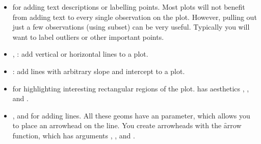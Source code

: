 % 
% 
% 
% 


\begin{itemize}
  \item {} for adding text descriptions or labelling points.  Most plots will not benefit from adding text to every single observation on the plot.  However, pulling out just a few observations (using subset) can be very useful.  Typically you will want to label outliers or other important points. 
  
  \item {}, : add vertical or horizontal lines to a plot.  
  
  \item {}: add lines with arbitrary slope and intercept to a plot. 
  
  \item {} for highlighting interesting rectangular regions of the plot.   has aesthetics , ,  and . 
  
  \item {},  and  for adding lines.  All these geoms have an  parameter, which allows you to place an arrowhead on the line.  You create arrowheads with the \f{arrow} function, which has arguments , ,  and . 
  
\end{itemize}

